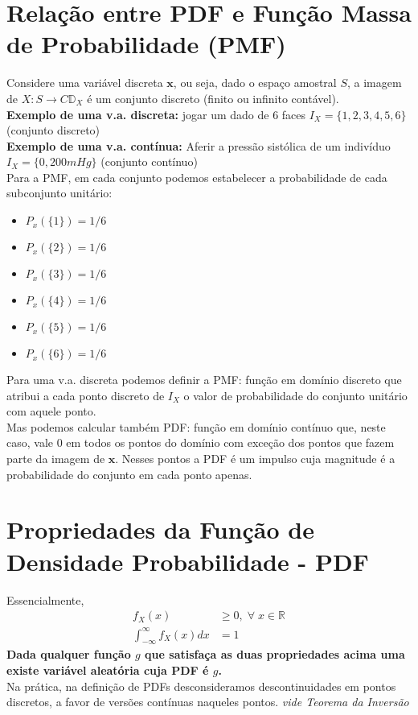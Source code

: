 \documentclass{article}
\renewcommand\bf[1]{\textbf{#1}}
\renewcommand\it[1]{\textit{#1}}
\begin{document}
\section{Relação entre PDF e Função Massa de Probabilidade (PMF)}
Considere uma variável discreta $\bf{x}$, ou seja, dado o espaço amostral $S$, a imagem de $X: S
\rightarrow C \mathbb{D}_X$ é um conjunto discreto (finito ou infinito contável).
\\
\bf{Exemplo de uma v.a. discreta:} jogar um dado de 6 faces $I_X = \{1,2,3,4,5,6\}$ (conjunto
discreto)
\\
\bf{Exemplo de uma v.a. contínua:} Aferir a pressão sistólica de um indivíduo $I_X=\{0,200mHg\}$ (conjunto contínuo)
\\
Para a PMF, em cada conjunto podemos estabelecer a probabilidade de cada subconjunto unitário:
\begin{itemize}[noitemsep,topsep=2pt]
    \item $P_x(\{1\}) = 1/6$
    \item $P_x(\{2\}) = 1/6$
    \item $P_x(\{3\}) = 1/6$
    \item $P_x(\{4\}) = 1/6$
    \item $P_x(\{5\}) = 1/6$
    \item $P_x(\{6\}) = 1/6$
\end{itemize}

Para uma v.a. discreta podemos definir a PMF: função em domínio discreto que atribui a cada ponto
discreto de $I_X$ o valor de probabilidade do conjunto unitário com aquele ponto.
\\
Mas podemos calcular também PDF: função em domínio contínuo que, neste caso, vale 0 em todos os
pontos do domínio com exceção dos pontos que fazem parte da imagem de $\bf{x}$. Nesses pontos a
PDF é um impulso cuja magnitude é a probabilidade do conjunto em cada ponto apenas.

\section{Propriedades da Função de Densidade Probabilidade - PDF}
Essencialmente,
\begin{align*}
    f_X(x) &\geq 0, \; \forall \; x \in \mathbb{R} \\
    \int^\infty_{-\infty} f_X(x)dx &= 1
\end{align*}
\bf{Dada qualquer função $g$ que satisfaça as duas propriedades acima uma existe variável aleatória
cuja PDF é $g$.}
\\
Na prática, na definição de PDFs desconsideramos descontinuidades em pontos discretos, a favor de
versões contínuas naqueles pontos. \it{vide Teorema da Inversão}
\end{document}
